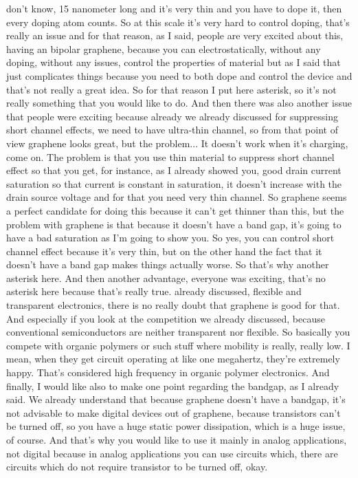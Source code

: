 don't know, 15 nanometer long and it's very thin and you have to dope it, then every doping atom counts. So at this scale it's very hard to control doping, that's really an issue and for that reason, as I said, people are very excited about this, having an bipolar graphene, because you can electrostatically, without any doping, without any issues, control the properties of material but as I said that just complicates things because you need to both dope and control the device and that's not really a great idea. So for that reason I put here asterisk, so it's not really something that you would like to do. And then there was also another issue that people were exciting because already we already discussed for suppressing short channel effects, we need to have ultra-thin channel, so from that point of view graphene looks great, but the problem... It doesn't work when it's charging, come on. The problem is that you use thin material to suppress short channel effect so that you get, for instance, as I already showed you, good drain current saturation so that current is constant in saturation, it doesn't increase with the drain source voltage and for that you need very thin channel. So graphene seems a perfect candidate for doing this because it can't get thinner than this, but the problem with graphene is that because it doesn't have a band gap, it's going to have a bad saturation as I'm going to show you. So yes, you can control short channel effect because it's very thin, but on the other hand the fact that it doesn't have a band gap makes things actually worse. So that's why another asterisk here. And then another advantage, everyone was exciting, that's no asterisk here because that's really true. already discussed, flexible and transparent electronics, there is no really doubt that graphene is good for that. And especially if you look at the competition we already discussed, because conventional semiconductors are neither transparent nor flexible. So basically you compete with organic polymers or such stuff where mobility is really, really low. I mean, when they get circuit operating at like one megahertz, they're extremely happy. That's considered high frequency in organic polymer electronics. And finally, I would like also to make one point regarding the bandgap, as I already said. We already understand that because graphene doesn't have a bandgap, it's not advisable to make digital devices out of graphene, because transistors can't be turned off, so you have a huge static power dissipation, which is a huge issue, of course. And that's why you would like to use it mainly in analog applications, not digital because in analog applications you can use circuits which, there are circuits which do not require transistor to be turned off, okay.
